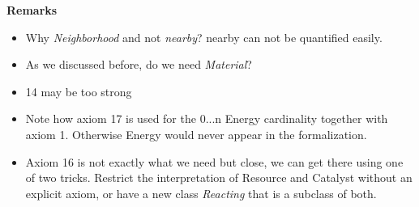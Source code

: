\documentclass[10pt,a4paper,fleqn]{article}
\begin{document}
\bigskip 
\textbf{Remarks}
\begin{itemize}
\item Why \textit{Neighborhood} and not \textit{nearby}? nearby can not be quantified easily.
\item As we discussed before, do we need \textit{Material}?
\item 14 may be too strong
\item Note how axiom 17 is used for the 0...n Energy cardinality together with axiom 1. Otherwise Energy would never appear in the formalization.
\item Axiom 16 is not exactly what we need but close, we can get there using one of two tricks. Restrict the interpretation of Resource and Catalyst without an explicit axiom, or have a new class \textit{Reacting} that is a subclass of both.
\end{itemize}
\end{document}
